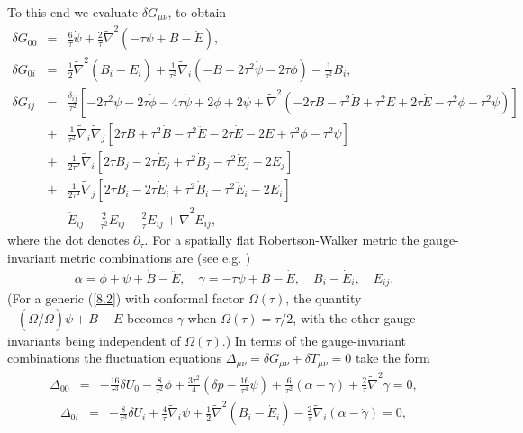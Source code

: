\documentclass[aps,onecolumn,10pt]{revtex4}
\numberwithin{equation}{section}
\numberwithin{equation}{section}
\begin{document}
To this end we evaluate $\delta G_{\mu\nu}$, to obtain 
%
\begin{eqnarray}
\delta G_{00}&=&\frac{6}{\tau}\dot{\psi}+\frac{2}{\tau}\tilde{\nabla}^2(-\tau \psi +B-\dot{E}),
\nonumber\\
\delta G_{0i}&=&\frac{1}{2}\tilde{\nabla}^2(B_i-\dot{E}_i)+\frac{1}{\tau^2}\tilde{\nabla}_i(-B-2\tau^2\dot{\psi}-2\tau \phi)-\frac{1}{\tau^2}B_i,
\nonumber\\
\delta G_{ij}&=&\frac{\delta_{ij}}{\tau^2}\left[-2\tau^2\ddot{\psi}-2\tau\dot{\phi}-4\tau\dot{\psi}+2\phi+2\psi+\tilde{\nabla}^2\left(-2\tau B-\tau^2\dot{B}+\tau^2\ddot{E}+2\tau\dot{E}-\tau^2\phi+\tau^2\psi\right)\right]
\nonumber\\
&+&\frac{1}{\tau^2}\tilde{\nabla}_i\tilde{\nabla}_j\left[2\tau B +\tau^2\dot{B}-\tau^2\ddot{E}-2\tau\dot{E}-2E+\tau^2\phi-\tau^2\psi\right]
\nonumber\\
&+&\frac{1}{2\tau^2}\tilde{\nabla}_i\left[2\tau B_j-2\tau\dot{E}_j+\tau^2\dot{B}_j-\tau^2\ddot{E}_j-2E_j\right]
\nonumber\\
&+&\frac{1}{2\tau^2}\tilde{\nabla}_j\left[2\tau B_i-2\tau\dot{E}_i+\tau^2\dot{B}_i-\tau^2\ddot{E}_i-2E_i\right]
\nonumber\\
&-&\ddot{E}_{ij}-\frac{2}{\tau^2}E_{ij}-\frac{2}{\tau}\dot{E}_{ij}+\tilde{\nabla}^2E_{ij},
\label{8.6}
\end{eqnarray}
%
where the dot denotes $\partial_\tau$.
For a spatially flat Robertson-Walker  metric the gauge-invariant metric combinations are (see e.g. \cite{Amarasinghe2018})
%
\begin{eqnarray}
\alpha=\phi+\psi+\dot{B}-\ddot{E} ,\quad \gamma=-\tau\psi+B-\dot{E}, \quad B_i-\dot{E}_i,\quad E_{ij}.
\label{8.7}
\end{eqnarray}
%
(For a generic (\ref{8.2}) with conformal factor $\Omega(\tau)$, the quantity $-(\Omega/\dot{\Omega})\psi+B-\dot{E}$ becomes $\gamma$ when $\Omega(\tau)=\tau/2$, with the other gauge invariants being independent of $\Omega(\tau)$.)
In terms of the gauge-invariant combinations the fluctuation equations $\Delta_{\mu\nu}=\delta G_{\mu\nu}+\delta T_{\mu\nu}=0$ take the form
%
\begin{eqnarray}
 \Delta_{00}&=&-\frac{16}{\tau^3}\delta U_{0}-\frac{8}{\tau^2}\phi+\frac{3\tau^2}{4}\left(\delta p -\frac{16}{\tau^4}\psi\right)
 +\frac{6}{\tau^2}(\alpha-\dot{\gamma})+\frac{2}{\tau}\tilde{\nabla}^2\gamma=0,
\label{8.8}
\end{eqnarray}
%
\begin{eqnarray}
 \Delta_{0i}&=&-\frac{8}{\tau^3}\delta U_{i}+\frac{4}{\tau}\tilde{\nabla}_i\psi
 +\frac{1}{2}\tilde{\nabla}^2(B_i-\dot{E}_i)-\frac{2}{\tau}\tilde{\nabla}_i(\alpha-\dot{\gamma})=0,
\label{8.9}
\end{eqnarray}
\end{document}
